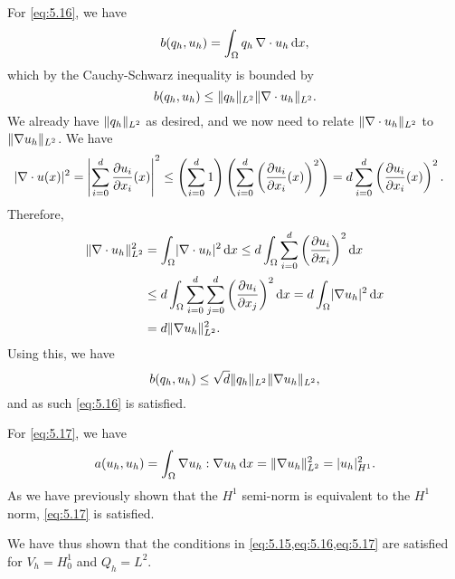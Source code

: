 \begin{solution}{5.1}
    For \cref{eq:5.16}, we have
    \begin{equation}
        b(q_h, u_h) = \int_{\Omega} q_h \, \nabla \cdot u_h \diff x,
    \end{equation}
    which by the Cauchy-Schwarz inequality is bounded by
    \begin{equation}
        b(q_h, u_h) \leq \norm{q_h}_{L^2} \norm{\nabla \cdot u_h}_{L^2}.
    \end{equation}
    We already have $\norm{q_h}_{L^2}$ as desired, and we now need to relate $\norm{\nabla \cdot u_h}_{L^2}$ to $\norm{\nabla u_h}_{L^2}$.
    We have
    \begin{align*}
        \abs{\nabla \cdot u(x)}^2
        &= \abs*{\sum_{i = 0}^{d} \frac{\partial u_i}{\partial x_i}(x)}^2
        \leq \left(
            \sum_{i = 0}^{d} 1
        \right) \left(
            \sum_{i = 0}^{d} \left( \frac{\partial u_i}{\partial x_i}(x) \right)^2
        \right)
        = d \sum_{i = 0}^{d} \left( \frac{\partial u_i}{\partial x_i}(x) \right)^2.
    \end{align*}
    Therefore,
    \begin{align*}
        \norm{\nabla \cdot u_h}_{L^2}^2
        &= \int_{\Omega} \abs{\nabla \cdot u_h}^2 \diff x
        \leq d \int_{\Omega} \sum_{i = 0}^{d} \left(
            \frac{\partial u_i}{\partial x_i}
        \right)^2 \diff x \\
        &\leq d \int_{\Omega} \sum_{i = 0}^{d} \sum_{j = 0}^{d} \left(
            \frac{\partial u_i}{\partial x_j}
        \right)^2 \diff x
        = d \int_{\Omega} \abs{\nabla u_h}^2 \diff x \\
        &= d \norm{\nabla u_h}_{L^2}^2.
    \end{align*}
    Using this, we have
    \begin{equation}
        b(q_h, u_h) \leq \sqrt{d} \norm{q_h}_{L^2} \norm{\nabla u_h}_{L^2},
    \end{equation}
    and as such \cref{eq:5.16} is satisfied.

    For \cref{eq:5.17}, we have
    \begin{equation}
        a(u_h, u_h)
        = \int_{\Omega} \nabla u_h : \nabla u_h \diff x
        = \norm{\nabla u_h}_{L^2}^2 = \abs{u_h}_{H^1}^2.
    \end{equation}
    As we have previously shown that the $H^1$ semi-norm is equivalent to the $H^1$ norm, \cref{eq:5.17} is satisfied.

    We have thus shown that the conditions in \cref{eq:5.15,eq:5.16,eq:5.17} are satisfied for $V_h = H^1_0$ and $Q_h = L^2$.
\end{solution}